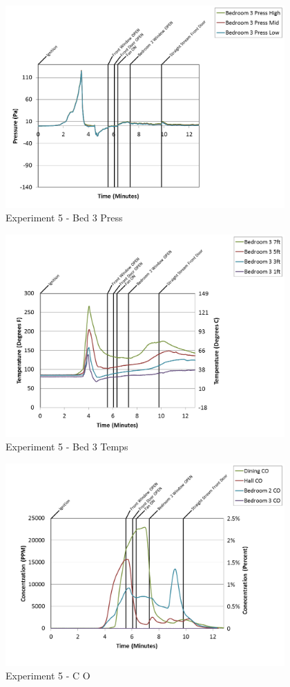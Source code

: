 \documentclass{article}
\begin{document}
\begin{appendices}
\begin{figure}[h!]
	\centering
	\includegraphics[height=3.05in]{0_Images/Results_Charts/Exp_5_Charts/Bed3Press.png}
	\caption{Experiment 5 - Bed 3 Press}
\end{figure}

\clearpage

\begin{figure}[h!]
	\centering
	\includegraphics[height=3.05in]{0_Images/Results_Charts/Exp_5_Charts/Bed3Temps.png}
	\caption{Experiment 5 - Bed 3 Temps}
\end{figure}


\begin{figure}[h!]
	\centering
	\includegraphics[height=3.05in]{0_Images/Results_Charts/Exp_5_Charts/CO.png}
	\caption{Experiment 5 - C O}
\end{figure}


\end{appendices}
\end{document}
